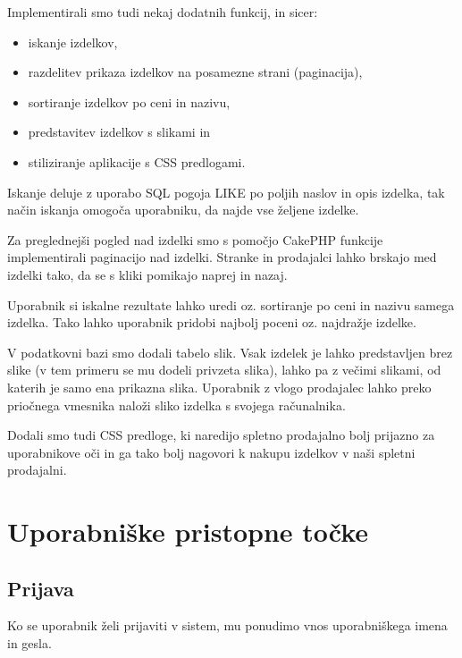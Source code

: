 \documentclass[a4paper,12pt]{report}
\begin{document}
Implementirali smo tudi nekaj dodatnih funkcij, in sicer:

\begin{itemize}
  \item iskanje izdelkov,
  \item razdelitev prikaza izdelkov na posamezne strani (paginacija),
  \item sortiranje izdelkov po ceni in nazivu,
  \item predstavitev izdelkov s slikami in
  \item stiliziranje aplikacije s CSS predlogami.
\end{itemize}

Iskanje deluje z uporabo SQL pogoja LIKE po poljih naslov in opis izdelka, tak način iskanja omogoča uporabniku, da najde vse željene izdelke.

Za preglednejši pogled nad izdelki smo s pomočjo CakePHP funkcije implementirali paginacijo nad izdelki. Stranke in prodajalci lahko brskajo med izdelki tako, da se s kliki pomikajo naprej in nazaj.

Uporabnik si iskalne rezultate lahko uredi oz. sortiranje po ceni in nazivu samega izdelka. Tako lahko uporabnik pridobi najbolj poceni oz. najdražje izdelke.

V podatkovni bazi smo dodali tabelo slik. Vsak izdelek je lahko predstavljen brez slike (v tem primeru se mu dodeli privzeta slika), lahko pa z večimi slikami, od katerih je samo ena prikazna slika. Uporabnik z vlogo prodajalec lahko preko priočnega vmesnika naloži sliko izdelka s svojega računalnika.

Dodali smo tudi CSS predloge, ki naredijo spletno prodajalno bolj prijazno za uporabnikove oči in ga tako bolj nagovori k nakupu izdelkov v naši spletni prodajalni.
\chapter{Uporabniške pristopne točke}


\section{Prijava}

Ko se uporabnik želi prijaviti v sistem, mu ponudimo vnos uporabniškega imena in gesla.
\end{document}
